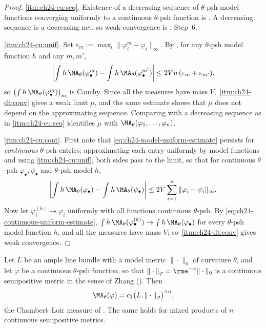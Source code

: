 \begin{proof}
\cref{itm:ch24-cu:seq}.  Existence of a decreasing sequence of $\theta$-psh
model functions converging uniformly to a continuous $\theta$-psh function
is .  A decreasing sequence is
a decreasing net, so weak convergence is
, Step~6.

\cref{itm:ch24-cu:unif}.  Set $\varepsilon_m:=\max_i\|\varphi_i^m
-\varphi_i\|_\infty$.  By , for any
$\theta$-psh model function $h$ and any $m,m'$,
\[
 \left|\int h\,\MA_\theta(\varphi^m_\bullet)
      -\int h\,\MA_\theta(\varphi^{m'}_\bullet)\right|
 \leq 2Vn\,(\varepsilon_m+\varepsilon_{m'}),
\]
so $\bigl(\int h\,\MA_\theta(\varphi^m_\bullet)\bigr)_m$ is Cauchy.  Since
all the measures have mass $V$,
\,\cref{itm:ch24-dt:conv} gives a weak limit
$\mu$, and the same estimate shows that $\mu$ does not depend on the
approximating sequence.  Comparing with a decreasing sequence as in
\cref{itm:ch24-cu:seq} identifies $\mu$ with
$\MA_\theta(\varphi_1,\ldots,\varphi_n)$.

\cref{itm:ch24-cu:cont}.  First note that
\eqref{eq:ch24-model-uniform-estimate} persists for \emph{continuous}
$\theta$-psh entries: approximating each entry uniformly by model
functions and using \cref{itm:ch24-cu:unif}, both sides pass to the limit, so
that for continuous $\theta$-psh $\varphi_\bullet,\psi_\bullet$ and
$\theta$-psh model $h$,
\begin{equation}
\label{eq:ch24-continuous-uniform-estimate}
 \left|\int h\,\MA_\theta(\varphi_\bullet)
      -\int h\,\MA_\theta(\psi_\bullet)\right|
 \leq 2V\sum_{i=1}^{n}\|\varphi_i-\psi_i\|_\infty .
\end{equation}
Now let $\varphi_i^{(k)}\to\varphi_i$ uniformly with all functions
continuous $\theta$-psh.  By \eqref{eq:ch24-continuous-uniform-estimate},
$\int h\,\MA_\theta(\varphi^{(k)}_\bullet)\to
\int h\,\MA_\theta(\varphi_\bullet)$ for every $\theta$-psh model
function $h$, and all the measures have mass $V$; so
\,\cref{itm:ch24-dt:conv} gives weak convergence.
\end{proof}

\begin{corollary}
\label{cor:ch24-continuous-cl}
Let $L$ be an ample line bundle with a model metric $\|\cdot\|_0$ of
curvature $\theta$, and let $\varphi$ be a continuous $\theta$-psh
function, so that $\|\cdot\|_\varphi=\rme^{-\varphi}\|\cdot\|_0$ is a
continuous semipositive metric in the sense of Zhang
().  Then
\[
 \MA_\theta(\varphi)=c_1\bigl(L,\|\cdot\|_\varphi\bigr)^{\wedge n},
\]
the Chambert--Loir measure of .  The same
holds for mixed products of $n$ continuous semipositive metrics.
\end{corollary}


